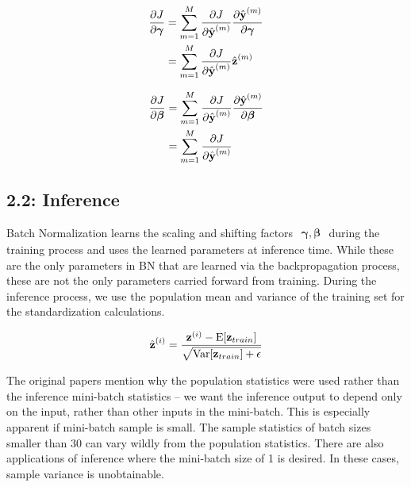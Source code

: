 \documentclass{article}
\begin{document}
\begin{multicols}{2}
\begin{equation}
    \begin{aligned}
        {\partial J \over \partial \boldsymbol{\gamma}}
        & =
        \sum_{m=1}^M{\partial J\over \partial \hat{\textbf{y}}^{(m)}}
        {\partial \hat{\textbf{y}}^{(m)} \over \partial \boldsymbol{\gamma}} \\
        & =
        \sum_{m=1}^M{\partial J\over \partial \hat{\textbf{y}}^{(m)}}
        \hat{\textbf{z}}^{(m)} 
    \end{aligned}
\end{equation}

\begin{equation}
    \begin{aligned}
        {\partial J \over \partial \boldsymbol{\beta}}
        & =
        \sum_{m=1}^M{\partial J\over \partial \hat{\textbf{y}}^{(m)}} 
        {\partial \hat{\textbf{y}}^{(m)} \over \partial \boldsymbol{\beta}} \\
        & =
        \sum_{m=1}^M{\partial J\over \partial \hat{\textbf{y}}^{(m)}}
    \end{aligned}
\end{equation}









\subsection*{2.2: Inference}

Batch Normalization learns the scaling and shifting factors $\begin{aligned}
    \boldsymbol{\gamma}, \boldsymbol{\beta}
\end{aligned}$ during the training process and uses the learned parameters at inference 
time. While these are the only parameters in BN that are learned via the 
backpropagation process, these are not the only parameters carried forward
from training. During the inference process, we use the population mean 
and variance of the training set for the standardization calculations.

\begin{equation}
    \hat{\textbf{z}}^{(i)} = {\textbf{z}^{(i)} - \text{E}[\textbf{z}_{train}] \over \sqrt{\text{Var}[\textbf{z}_{train}] + \epsilon}}
\end{equation}

The original papers mention why the population statistics were used rather 
than the inference mini-batch statistics -- we want the inference output
to depend only on the input, rather than other inputs in the mini-batch.
This is especially apparent if mini-batch sample is small. The sample statistics
of batch sizes smaller than 30 can vary wildly from the population statistics.
There are also applications of inference where the mini-batch size of 1 is 
desired. In these cases, sample variance is unobtainable.


\end{multicols}
\end{document}
